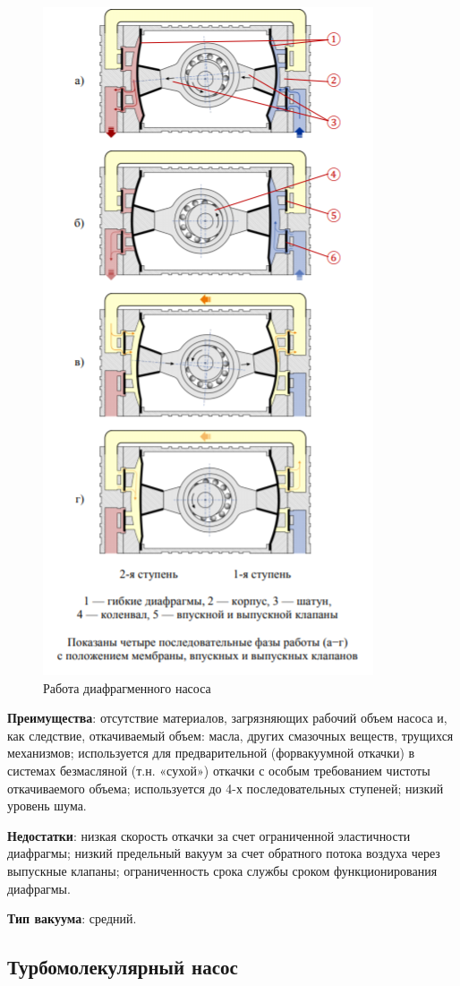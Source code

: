 \documentclass[a4paper,12pt]{article}
\begin{document}
\begin{figure}[h]
    \centering
    \includegraphics[width = 7.5 cm]{ДН}
    \caption{Работа диафрагменного насоса}
    \label{fig:vac}
\end{figure}

\textbf{Преимущества}: отсутствие материалов, загрязняющих рабочий
объем насоса и, как следствие, откачиваемый объем: масла, других смазочных веществ, трущихся механизмов; используется для предварительной (форвакуумной откачки) в системах безмасляной (т.н. «сухой») откачки с особым требованием чистоты откачиваемого объема; используется до 4-х последовательных ступеней; низкий уровень шума.

\textbf{Недостатки}: низкая скорость откачки за счет ограниченной эластичности диафрагмы; низкий предельный вакуум за счет обратного потока воздуха через выпускные клапаны; ограниченность срока службы
сроком функционирования диафрагмы.

\textbf{Тип вакуума}: средний.

\subsection{Турбомолекулярный насос}
\end{document}
